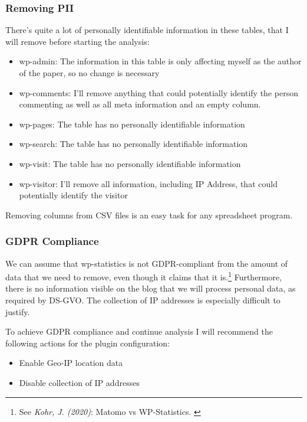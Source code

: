 \subsubsection{Removing PII}

There's quite a lot of personally identifiable information in these tables, that I will remove before starting the analysis:

\begin{itemize}
 \item wp-admin: The information in this table is only affecting myself as the author of the paper, so no change is necessary
 \item wp-comments: I'll remove anything that could potentially identify the person commenting as well as all meta information and an empty column.
 \item wp-pages: The table has no personally identifiable information
 \item wp-search: The table has no personally identifiable information
 \item wp-visit: The table has no personally identifiable information
 \item wp-visitor: I'll remove all information, including IP Address, that could potentially identify the visitor
\end{itemize}

Removing columns from CSV files is an easy task for any spreadsheet program.

\subsubsection{GDPR Compliance}

We can assume that wp-statistics is not GDPR-compliant from the amount of data that we need to remove, even though it claims that it is.\footnote{See \textit{Kohr, J. (2020)}: Matomo vs WP-Statistics. \cite{matomoBlog}} Furthermore, there is no information visible on the blog that we will process personal data, as required by DS-GVO. The collection of IP addresses is especially difficult to justify. 

To achieve GDPR compliance and continue analysis I will recommend the following actions for the plugin configuration:

\begin{itemize}
 \item Enable Geo-IP location data
 \item Disable collection of IP addresses
\end{itemize}

